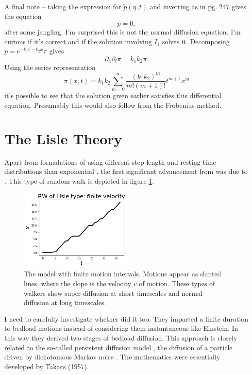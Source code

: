 \documentclass[11pt]{article}
\newcommand\be{\begin{equation}} %
\newcommand\ee{\end{equation}}   %
\begin{document}
A final note -- taking the expression for $\tilde{p}(\eta,t)$ and inverting as in \citet{Weiss1994} pg. 247 gives the equation 
\be [k_1 \partial_x + k_2\partial_t + \partial_x \partial_t] p = 0, \ee
after some jangling.
I'm surprised this is not the normal diffusion equation.
I'm curious if it's correct and if the solution involving $I_1$ solves it.
Decomposing $p = e^{-k_1 t - k_2 x}\pi$ gives 
\be \partial_x \partial_t \pi = k_1 k_2\pi.\ee
Using the series representation 
\be \pi(x,t) = k_1k_2 \sum_{m=0}^\infty \frac{(k_1k_2)^m}{m!(m+1)!}t^{m+1}x^m \ee
it's possible to see that the solution given earlier satisfies this differential equation. Presumably this would also follow from the Frobenius method.
\section{The Lisle Theory}
Apart from formulations of \citet{Einstein1937} using different step length and resting time distributions than exponential \citep[e.g.][]{Sayre1965}, the first significant advancement from \citet{Einstein1937} was due to \citet{Lisle1998}.
This type of random walk is depicted in figure \ref{fig:lislewalk}.
\begin{figure}
	\centering
	\includegraphics[width=0.5\textwidth,keepaspectratio]{lisle_rw.png}
	\caption{The \citet{Lisle1998} model with finite motion intervals. Motions appear as slanted lines, where the slope is the velocity $v$ of motion. These types of walkers show super-diffusion at short timescales and normal diffusion at long timescales.}
	\label{fig:lislewalk}
\end{figure}
I need to carefully investigate whether \citet{Gordon1972} did it too.
They imparted a finite duration to bedload motions instead of considering them instantaneous like Einstein. In this way they derived two stages of bedload diffusion.
This approach is closely related to the so-called persistent diffusion model \citep{Balakrishnan1988,VanDenBroeck1990}, the diffusion of a particle driven by dichotomous Markov noise \citep[e.g.][]{Horsthemke1984,Risken1989,Bena2006}. 
The mathematics were essentially developed by Takacs (1957).
\end{document}
